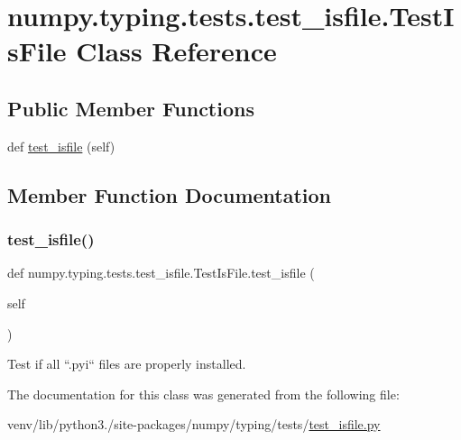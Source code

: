 \hypertarget{classnumpy_1_1typing_1_1tests_1_1test__isfile_1_1TestIsFile}{}\section{numpy.\+typing.\+tests.\+test\+\_\+isfile.\+Test\+Is\+File Class Reference}
\label{classnumpy_1_1typing_1_1tests_1_1test__isfile_1_1TestIsFile}
\subsection*{Public Member Functions}
\begin{DoxyCompactItemize}
\item 
def \hyperlink{classnumpy_1_1typing_1_1tests_1_1test__isfile_1_1TestIsFile_a169e61d05b6a225a44c9d9fe232c1cc3}{test\+\_\+isfile} (self)
\end{DoxyCompactItemize}


\subsection{Member Function Documentation}
\mbox{\label{classnumpy_1_1typing_1_1tests_1_1test__isfile_1_1TestIsFile_a169e61d05b6a225a44c9d9fe232c1cc3}} 
\subsubsection{\texorpdfstring{test\+\_\+isfile()}{test\_isfile()}}
{\footnotesize\ttfamily def numpy.\+typing.\+tests.\+test\+\_\+isfile.\+Test\+Is\+File.\+test\+\_\+isfile (\begin{DoxyParamCaption}\item[{}]{self }\end{DoxyParamCaption})}

\begin{DoxyVerb}Test if all ``.pyi`` files are properly installed.\end{DoxyVerb}
 

The documentation for this class was generated from the following file\+:\begin{DoxyCompactItemize}
\item 
venv/lib/python3./site-\/packages/numpy/typing/tests/\hyperlink{test__isfile_8py}{test\+\_\+isfile.\+py}\end{DoxyCompactItemize}
